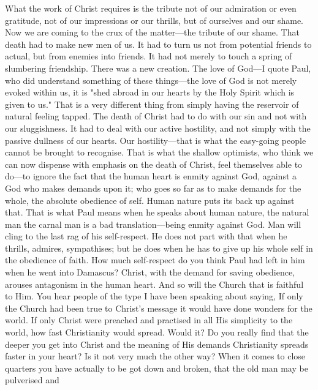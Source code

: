 \documentclass[12pt,a5paper,twoside,titlepage]{book}
\begin{document}
What the work of Christ requires is the 
tribute not of our admiration or even gratitude, 
not of our impressions or our thrills, but 
of ourselves and our shame. Now we are coming 
to the crux of the matter---the tribute of our 
shame. That death had to make new men of 
us. It had to turn us not from potential friends 
to actual, but from enemies into friends. It 
had not merely to touch a spring of slumbering 
friendship. There was a new creation. The 
love of God---I quote Paul, who did understand 
something of these things---the love of God is 
not merely evoked within us, it is "shed abroad 
in our hearts by the Holy Spirit which is given 
to us." That is a very different thing from 
simply having the reservoir of natural feeling 
tapped. The death of Christ had to do with 
our sin and not with our sluggishness. It had 
to deal with our active hostility, and not simply 
with the passive dullness of our hearts. Our 
hostility---that is what the easy-going people
cannot be brought to recognise. That is what 
the shallow optimists, who think we can now 
dispense with emphasis on the death of Christ, 
feel themselves able to do---to ignore the fact 
that the human heart is enmity against God, 
against a God who makes demands upon it; 
who goes so far as to make demands for 
the whole, the absolute obedience of self. 
Human nature puts its back up against that. 
That is what Paul means when he speaks 
about human nature, the natural man the 
carnal man is a bad translation---being enmity 
against God. Man will cling to the last rag of 
his self-respect. He does not part with that 
when he thrills, admires, sympathises; but he
does when he has to give up his whole self in 
the obedience of faith. How much self-respect 
do you think Paul had left in him when he went 
into Damascus? Christ, with the demand for 
saving obedience, arouses antagonism in the 
human heart. And so will the Church that 
is faithful to Him. You hear people of the 
type I have been speaking about saying, If 
only the Church had been true to Christ's 
message it would have done wonders for the 
world. If only Christ were preached and practised 
in all His simplicity to the world, how fast 
Christianity would spread. Would it? Do you
really find that the deeper you get into Christ 
and the meaning of His demands Christianity 
spreads faster in your heart? Is it not very 
much the other way? When it comes to close 
quarters you have actually to be got down and 
broken, that the old man may be pulverised and 
\end{document}
